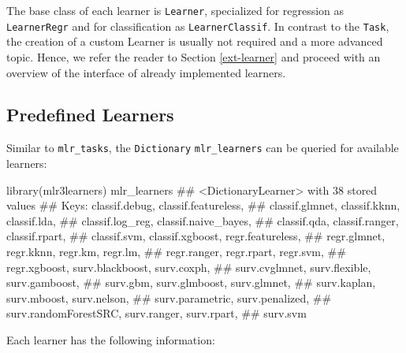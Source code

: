 \documentclass[
  11pt,
  parskip=half,
  DIV=calc,
  BCOR=10mm,
  x11names]{scrbook}
\newenvironment{Shaded}{}{}
\newcommand{\KeywordTok}[1]{\textcolor[rgb]{0.00,0.00,1.00}{#1}}
\newcommand{\NormalTok}[1]{#1}
\begin{document}
The base class of each learner is \texttt{Learner}, specialized for regression as \texttt{LearnerRegr} and for classification as \texttt{LearnerClassif}.
In contrast to the \texttt{Task}, the creation of a custom Learner is usually not required and a more advanced topic.
Hence, we refer the reader to Section \ref{ext-learner} and proceed with an overview of the interface of already implemented learners.

\hypertarget{learners-predefined}{%
\subsection{Predefined Learners}\label{learners-predefined}}

Similar to \texttt{mlr\_tasks}, the \texttt{Dictionary} \texttt{mlr\_learners} can be queried for available learners:

\begin{Shaded}
\begin{Highlighting}[]
\KeywordTok{library}\NormalTok{(mlr3learners)}
\NormalTok{mlr_learners}
\NormalTok{## <DictionaryLearner> with 38 stored values}
\NormalTok{## Keys: classif.debug, classif.featureless,}
\NormalTok{##   classif.glmnet, classif.kknn, classif.lda,}
\NormalTok{##   classif.log_reg, classif.naive_bayes,}
\NormalTok{##   classif.qda, classif.ranger, classif.rpart,}
\NormalTok{##   classif.svm, classif.xgboost, regr.featureless,}
\NormalTok{##   regr.glmnet, regr.kknn, regr.km, regr.lm,}
\NormalTok{##   regr.ranger, regr.rpart, regr.svm,}
\NormalTok{##   regr.xgboost, surv.blackboost, surv.coxph,}
\NormalTok{##   surv.cvglmnet, surv.flexible, surv.gamboost,}
\NormalTok{##   surv.gbm, surv.glmboost, surv.glmnet,}
\NormalTok{##   surv.kaplan, surv.mboost, surv.nelson,}
\NormalTok{##   surv.parametric, surv.penalized,}
\NormalTok{##   surv.randomForestSRC, surv.ranger, surv.rpart,}
\NormalTok{##   surv.svm}
\end{Highlighting}
\end{Shaded}

Each learner has the following information:
\end{document}
